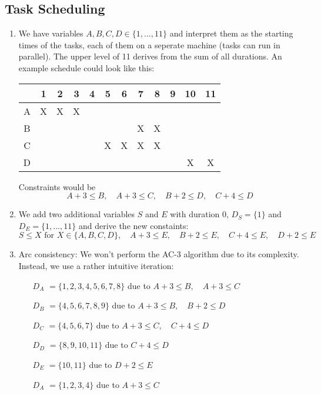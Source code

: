\documentclass[a4paper, oneside]{scrartcl}
\begin{document}
\subsection{Task Scheduling}

\begin{enumerate}
\item 
We have variables $A,B,C,D \in \{1,...,11\}$ and interpret them as the starting times of the tasks, 
each of them on a seperate machine (tasks can run in parallel). 
The upper level of 11 derives from the sum of all durations. An example schedule could look like this:

\renewcommand{\arraystretch}{1.2}
\begin{tabular}{|c|c|c|c|c|c|c|c|c|c|c|c|}
\hline
  & 1 & 2 & 3 & 4 & 5 & 6 & 7 & 8 & 9 & 10 & 11 \\ \hline
A & X & X & X &   &   &   &   &   &   &    &    \\ \hline
B &   &   &   &   &   &   & X & X &   &    &    \\ \hline
C &   &   &   &   & X & X & X & X &   &    &    \\ \hline
D &   &   &   &   &   &   &   &   &   & X  &  X \\ \hline
\end{tabular}

Constraints would be
\[ A + 3 \leq B,\quad A + 3 \leq C,\quad B + 2 \leq D,\quad C + 4 \leq D \]

\item 
We add two additional variables $S$ and $E$ with duration $0$, $D_S = \{1\}$ and $D_E = \{1,...,11\}$
and derive the new constaints: 
\[ S \leq X \text{ for } X \in \{A,B,C,D\}, \quad A+3 \leq E,\quad B+2 \leq E,\quad C+4 \leq E,\quad D+2 \leq E\]

\item Arc consistency: We won't perform the AC-3 algorithm due to its complexity. 
Instead, we use a rather intuitive iteration:

\begin{itemize}
\item[$D_A$] $ = \{1, 2, 3, 4, 5, 6, 7, 8 \}$ due to $A + 3 \leq B,\quad A + 3 \leq C$
\item[$D_B$] $ = \{4, 5, 6, 7, 8, 9 \}$ due to $A + 3 \leq B,\quad B + 2 \leq D$
\item[$D_C$] $ = \{4, 5, 6, 7\}$ due to $A + 3 \leq C,\quad C + 4 \leq D$
\item[$D_D$] $ = \{8, 9, 10, 11\}$ due to $C + 4 \leq D$
\item[$D_E$] $ = \{10, 11\}$ due to $D+2 \leq E$
\item[$D_A$] $ = \{1, 2, 3, 4\}$ due to $A + 3 \leq C$
\end{itemize}



\end{enumerate}
\end{document}
